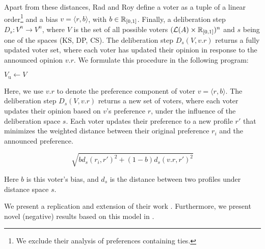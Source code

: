 Apart from these distances, Rad and Roy define a voter as a tuple of a linear
order\footnote{We exclude their analysis of preferences containing ties.} and a
bias \(v = \langle r, b \rangle\), with \( b \in \mathbb{R}_{[0,1]}\). Finally, a
deliberation step \(D_{s} : V^n \to V^n\), where $V$ is the set of all possible
voters $ (\mathcal{L}(A) \times \mathbb{R}_{[0,1]})^n$ and $s$ being one of
the spaces (KS, DP, CS). The deliberation step $D_s(V, v.r)$ returns a fully
updated voter set, where each voter has updated their opinion in response to
the announced opinion $v.r$. We formulate this procedure in the following
program:

\IncMargin{1em}
\begin{algorithm}[H]

	\BlankLine

	$V_{\text{u}} \gets V$ \\

\end{algorithm}
\DecMargin{1em}


Here, we use $v.r$ to denote the preference component of voter $v = \langle r, b \rangle$.
The deliberation step $D_s(V, v.r)$ returns a new set of voters, where each voter updates
their opinion based on $v$'s preference $r$, under the influence of the deliberation
space $s$. Each voter updates their preference to a new profile $r'$ that minimizes the weighted distance between their original preference $r_i$ and the announced preference.


\begin{equation}
	\sqrt{
		b d_s(r_i, r')^2 + (1-b)d_s(v.r, r')^2
	}
	\label{eq:deliberation_step_formula}
\end{equation}

Here $b$ is this voter's bias, and $d_s$ is the distance between two profiles
under distance space $s$.

We present a replication and extension of their work .
Furthermore, we present novel (negative) results based on this model in
.

